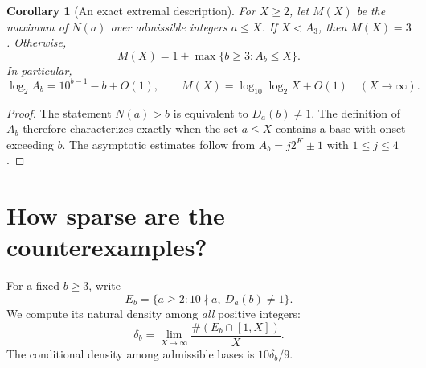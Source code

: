 \documentclass[11pt,a4paper]{article}
\newtheorem{corollary}[theorem]{Corollary}
\theoremstyle{definition}
\begin{document}
\begin{corollary}[An exact extremal description]
For $X\ge2$, let $M(X)$ be the maximum of $N(a)$ over admissible integers
$a\le X$. If $X<A_3$, then $M(X)=3$. Otherwise,
\[
M(X)=1+\max\{b\ge3:A_b\le X\}.
\]
In particular,
\[
\log_2 A_b=10^{b-1}-b+O(1),\qquad
M(X)=\log_{10}\log_2 X+O(1)\quad(X\to\infty).
\]
\end{corollary}
\begin{proof}
The statement $N(a)>b$ is equivalent to $D_a(b)\ne1$.
The definition of $A_b$ therefore characterizes exactly when the set
$a\le X$ contains a base with onset exceeding $b$. The asymptotic estimates
follow from $A_b=j2^K\pm1$ with $1\le j\le4$.
\end{proof}

\section{How sparse are the counterexamples?}\label{sec:density}

For a fixed $b\ge3$, write
\[
E_b=\{a\ge2:10\nmid a,\ D_a(b)\ne1\}.
\]
We compute its natural density among \emph{all} positive integers:
\[
\delta_b=\lim_{X\to\infty}\frac{\#(E_b\cap[1,X])}{X}.
\]
The conditional density among admissible bases is $10\delta_b/9$.
\end{document}
